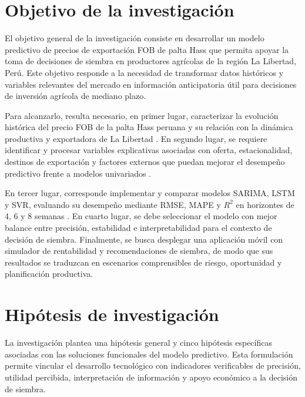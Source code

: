 \section{Objetivo de la investigaci\'on}

El objetivo general de la investigaci\'on consiste en desarrollar un modelo predictivo de precios de exportaci\'on FOB de palta Hass que permita apoyar la toma de decisiones de siembra en productores agr\'icolas de la regi\'on La Libertad, Per\'u. Este objetivo responde a la necesidad de transformar datos hist\'oricos y variables relevantes del mercado en informaci\'on anticipatoria \'util para decisiones de inversi\'on agr\'icola de mediano plazo.

Para alcanzarlo, resulta necesario, en primer lugar, caracterizar la evoluci\'on hist\'orica del precio FOB de la palta Hass peruana y su relaci\'on con la din\'amica productiva y exportadora de La Libertad \citep{VitteryFlores2023, SierraSelva2020}. En segundo lugar, se requiere identificar y procesar variables explicativas asociadas con oferta, estacionalidad, destinos de exportaci\'on y factores externos que puedan mejorar el desempe\~no predictivo frente a modelos univariados \citep{ReisFilho2022}.

En tercer lugar, corresponde implementar y comparar modelos SARIMA, LSTM y SVR, evaluando su desempe\~no mediante RMSE, MAPE y $R^{2}$ en horizontes de 4, 6 y 8 semanas \citep{Kurnadipare2025, Xia2024}. En cuarto lugar, se debe seleccionar el modelo con mejor balance entre precisi\'on, estabilidad e interpretabilidad para el contexto de decisi\'on de siembra. Finalmente, se busca desplegar una aplicaci\'on m\'ovil con simulador de rentabilidad y recomendaciones de siembra, de modo que sus resultados se traduzcan en escenarios comprensibles de riesgo, oportunidad y planificaci\'on productiva.

\section{Hip\'otesis de investigaci\'on}

La investigaci\'on plantea una hip\'otesis general y cinco hip\'otesis espec\'ificas asociadas con las soluciones funcionales del modelo predictivo. Esta formulaci\'on permite vincular el desarrollo tecnol\'ogico con indicadores verificables de precisi\'on, utilidad percibida, interpretaci\'on de informaci\'on y apoyo econ\'omico a la decisi\'on de siembra.

